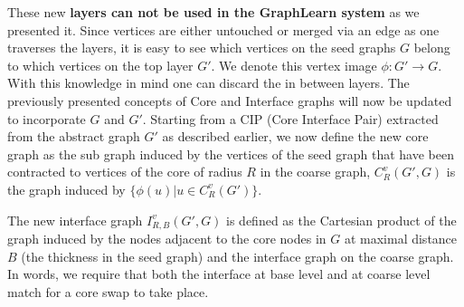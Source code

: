 \documentclass{article}
\begin{document}
These new \textbf{layers can not be used in the GraphLearn system} as we presented it. 
Since vertices are either untouched or merged via an edge as one traverses the layers,
it is easy to see which vertices on the seed graphs $G$ belong to which vertices on the
top layer $G'$. We denote this vertex image $\phi: G' \rightarrow G $. With this knowledge in mind one 
can discard the in between layers. The previously presented concepts of Core and Interface
graphs will now be updated to incorporate $G$ and $G'$.
Starting from a CIP (Core Interface Pair) extracted from the abstract graph $G'$ as 
described earlier, we now define the new core graph as the sub graph induced by the vertices of
the seed graph that have been contracted to vertices of the core of radius
$R$ in the coarse graph, $C_R^v(G',G)$ is the graph induced by 
$\{ \phi(u)  | u \in C_R^v(G') \}$. 

The new interface graph
$I_{R,B}^v(G',G)$ is defined as the Cartesian product of the graph induced by
the nodes adjacent to the core nodes in $G$ at maximal distance $B$ (the
thickness in the seed graph) and the interface graph on the coarse graph. In
words, we require that both the interface at base level and at coarse level
match for a core swap to take place.
\end{document}
